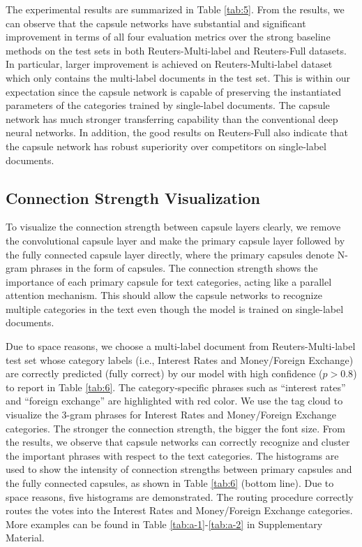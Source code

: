 \documentclass[11pt]{article}
\begin{document}
The experimental results are summarized in Table \ref{tab:5}. 
From the results, we can observe that the capsule networks 
have substantial and significant improvement in terms of all four evaluation metrics  over the strong baseline methods on the test sets in both Reuters-Multi-label and Reuters-Full datasets. In particular, larger improvement is achieved on Reuters-Multi-label dataset which only contains the multi-label documents in the test set. 
This is within our expectation since the capsule network is capable of preserving the instantiated parameters of the categories trained by single-label documents. The capsule network has much stronger transferring capability than the conventional deep neural networks. 
In addition, the good results on Reuters-Full also indicate that the capsule network has robust superiority over competitors on single-label documents.



\subsection{Connection Strength Visualization}
To visualize the connection strength between capsule layers clearly, we remove the convolutional capsule layer and make the primary capsule layer followed by the fully connected capsule layer directly, where the primary capsules denote N-gram phrases in the form of capsules. The connection strength shows the importance of each primary capsule for text  categories, acting like a parallel attention mechanism. This should allow the capsule networks to recognize multiple categories in the text even though the model is trained on single-label documents. 

Due to space reasons, we choose a multi-label document from Reuters-Multi-label test set whose category labels (i.e., Interest Rates and Money/Foreign Exchange) are correctly predicted (fully correct) by our model with high confidence ($p>0.8$) to report in Table \ref{tab:6}. 
The category-specific phrases such as ``interest rates'' and ``foreign exchange'' are highlighted with red color. We use the tag cloud to visualize the 3-gram phrases for 
Interest Rates and Money/Foreign Exchange categories. The stronger the connection strength, the bigger the font size.  From the results, we observe that capsule networks can correctly recognize and cluster the important phrases with respect to the text categories.
The histograms are used to show the intensity of connection strengths between primary capsules and the fully connected capsules, as shown in Table \ref{tab:6} (bottom line). Due to space reasons, five histograms are demonstrated.
The routing procedure correctly routes the votes into the Interest Rates and Money/Foreign Exchange categories. More examples can be found in Table \ref{tab:a-1}-\ref{tab:a-2} in Supplementary Material.
\end{document}
